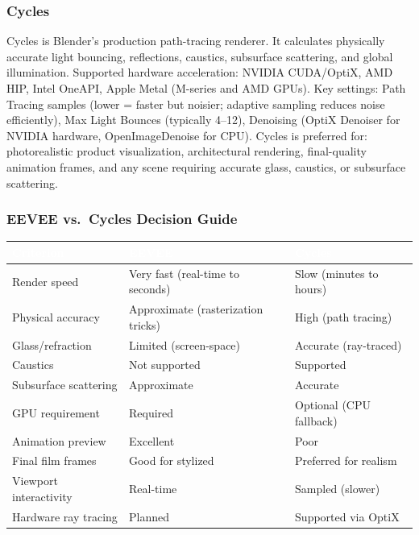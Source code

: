 \documentclass[11pt,letterpaper]{article}
\newcommand{\tableheader}[1]{\textbf{\sffamily\textcolor{white}{#1}}}
\begin{document}
\subsubsection{Cycles}

Cycles is Blender's production path-tracing renderer. It calculates physically accurate light bouncing, reflections, caustics, subsurface scattering, and global illumination. Supported hardware acceleration: NVIDIA CUDA/OptiX, AMD HIP, Intel OneAPI, Apple Metal (M-series and AMD GPUs). Key settings: Path Tracing samples (lower = faster but noisier; adaptive sampling reduces noise efficiently), Max Light Bounces (typically 4--12), Denoising (OptiX Denoiser for NVIDIA hardware, OpenImageDenoise for CPU). Cycles is preferred for: photorealistic product visualization, architectural rendering, final-quality animation frames, and any scene requiring accurate glass, caustics, or subsurface scattering.

\subsubsection{EEVEE vs.\ Cycles Decision Guide}

\begin{center}
\begin{tabularx}{\textwidth}{L{4cm}XL{4cm}}
\toprule
{}
\tableheader{Criterion} & \tableheader{EEVEE} & \tableheader{Cycles} \\
\midrule
Render speed & Very fast (real-time to seconds) & Slow (minutes to hours) \\
Physical accuracy & Approximate (rasterization tricks) & High (path tracing) \\
Glass/refraction & Limited (screen-space) & Accurate (ray-traced) \\
Caustics & Not supported & Supported \\
Subsurface scattering & Approximate & Accurate \\
GPU requirement & Required & Optional (CPU fallback) \\
Animation preview & Excellent & Poor \\
Final film frames & Good for stylized & Preferred for realism \\
Viewport interactivity & Real-time & Sampled (slower) \\
Hardware ray tracing & Planned & Supported via OptiX \\
\bottomrule
\end{tabularx}
\end{center}
\end{document}
